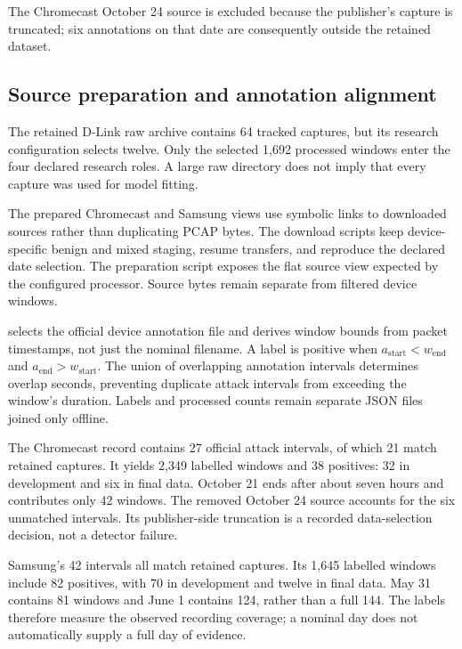 The Chromecast October 24 source is excluded because the publisher's capture is
truncated; six annotations on that date are consequently outside the retained
dataset.

\subsection{Source preparation and annotation alignment}

The retained D-Link raw archive contains 64 tracked captures, but its research
configuration selects twelve. Only the selected 1,692 processed windows enter
the four declared research roles. A large raw directory
does not imply that every capture was used for model fitting.

The prepared Chromecast and Samsung views use symbolic links to downloaded
sources rather than duplicating PCAP bytes. The download scripts keep
device-specific benign and mixed staging, resume transfers, and reproduce the
declared date selection. The preparation script exposes the flat source view
expected by the configured processor. Source bytes remain separate from
filtered device windows.

 selects the official device annotation file and
derives window bounds from packet timestamps, not just the nominal filename.
A label is positive when
$a_{\mathrm{start}}<w_{\mathrm{end}}$ and
$a_{\mathrm{end}}>w_{\mathrm{start}}$.
The union of overlapping annotation intervals determines overlap seconds,
preventing duplicate attack intervals from exceeding the window's duration.
Labels and processed counts remain separate JSON files joined only offline.

The Chromecast record contains 27 official attack intervals, of which 21
match retained captures. It yields 2,349 labelled windows and 38 positives:
32 in development and six in final data. October 21 ends after about seven
hours and contributes only 42 windows. The removed October 24 source accounts
for the six unmatched intervals. Its publisher-side truncation is a recorded
data-selection decision, not a detector failure.

Samsung's 42 intervals all match retained captures. Its 1,645 labelled windows
include 82 positives, with 70 in development and twelve in final data.
May 31 contains 81 windows and June 1 contains 124, rather than a full 144.
The labels therefore measure the observed recording coverage; a nominal day
does not automatically supply a full day of evidence.

